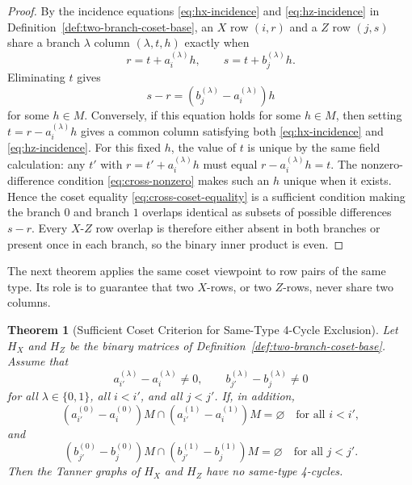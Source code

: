 \documentclass[11pt,a4paper]{article}
\newcommand{\HX}{H_X}
\newcommand{\HZ}{H_Z}
\theoremstyle{uprighttheorem}
\newtheorem{theorem}{Theorem}
\begin{document}
\begin{proof}
By the incidence equations \eqref{eq:hx-incidence} and \eqref{eq:hz-incidence} in Definition~\ref{def:two-branch-coset-base}, an $X$ row $(i,r)$ and a $Z$ row $(j,s)$ share a branch \(\lambda\) column $(\lambda,t,h)$ exactly when
\[
  r=t+a_i^{(\lambda)}h,\qquad
  s=t+b_j^{(\lambda)}h.
\]
Eliminating \(t\) gives
\[
  s-r=(b_j^{(\lambda)}-a_i^{(\lambda)})h
\]
for some $h\in M$.
Conversely, if this equation holds for some \(h\in M\), then setting \(t=r-a_i^{(\lambda)}h\) gives a common column satisfying both \eqref{eq:hx-incidence} and \eqref{eq:hz-incidence}.
For this fixed \(h\), the value of \(t\) is unique by the same field calculation: any \(t'\) with \(r=t'+a_i^{(\lambda)}h\) must equal \(r-a_i^{(\lambda)}h=t\).
The nonzero-difference condition \eqref{eq:cross-nonzero} makes such an $h$ unique when it exists.
Hence the coset equality \eqref{eq:cross-coset-equality} is a sufficient condition making the branch \(0\) and branch \(1\) overlaps identical as subsets of possible differences $s-r$.
Every $X$-$Z$ row overlap is therefore either absent in both branches or present once in each branch, so the binary inner product is even.
\end{proof}

The next theorem applies the same coset viewpoint to row pairs of the same type.
Its role is to guarantee that two \(X\)-rows, or two \(Z\)-rows, never share two columns.

\begin{theorem}[Sufficient Coset Criterion for Same-Type 4-Cycle Exclusion]\label{thm:same-type-4cycle-coset-condition}
Let $\HX$ and $\HZ$ be the binary matrices of Definition~\ref{def:two-branch-coset-base}.
Assume that
\begin{equation}
\label{eq:same-type-nonzero}
  a_{i'}^{(\lambda)}-a_i^{(\lambda)}\ne0,\qquad
  b_{j'}^{(\lambda)}-b_j^{(\lambda)}\ne0
\end{equation}
for all $\lambda\in\{0,1\}$, all $i<i'$, and all $j<j'$.
If, in addition,
\begin{equation}
\label{eq:x-same-type-disjoint}
  (a_{i'}^{(0)}-a_i^{(0)})M
  \cap
  (a_{i'}^{(1)}-a_i^{(1)})M
  =\varnothing
  \quad\text{for all } i<i',
\end{equation}
and
\begin{equation}
\label{eq:z-same-type-disjoint}
  (b_{j'}^{(0)}-b_j^{(0)})M
  \cap
  (b_{j'}^{(1)}-b_j^{(1)})M
  =\varnothing
  \quad\text{for all } j<j'.
\end{equation}
Then the Tanner graphs of $\HX$ and $\HZ$ have no same-type 4-cycles.
\end{theorem}
\end{document}
